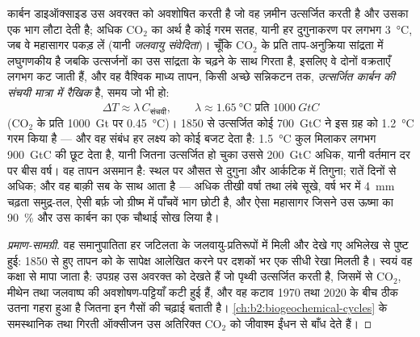 \begin{proposition}[तापन संचयी उत्सर्जनों के समानुपाती है]\label{prop:b2:global-change:tcre}
कार्बन डाइऑक्साइड उस अवरक्त को अवशोषित करती है जो वह ज़मीन उत्सर्जित करती है और उसका
एक भाग लौटा देती है; अधिक \ensuremath{\mathrm{CO_2}} का अर्थ है कोई गरम सतह, यानी
हर दुगुनाकरण पर लगभग \qty{3}{\celsius}, जब वे महासागर पकड़ लें
(यानी \emph{जलवायु संवेदिता})। चूँकि \ensuremath{\mathrm{CO_2}} के प्रति
ताप-अनुक्रिया सांद्रता में लघुगणकीय है जबकि उत्सर्जनों का  उस सांद्रता के चढ़ने के साथ गिरता है, इसलिए वे दोनों
वक्रताएँ लगभग कट जाती हैं, और वह वैश्विक माध्य तापन, किसी अच्छे
सन्निकटन तक, \emph{उत्सर्जित कार्बन की संचयी मात्रा में रैखिक} है,
समय जो भी हो:
\[
\Delta T \approx \lambda\,C_{\text{संचयी}}, \qquad \lambda \approx
\qty{1.65}{\celsius} \text{ प्रति } \qty{1000}{GtC}
\]
(\ensuremath{\mathrm{CO_2}} के प्रति \qty{1000}{Gt} पर \qty{0.45}{\celsius})। 1850 से
उत्सर्जित कोई \qty{700}{GtC} ने इस ग्रह को \qty{1.2}{\celsius}
गरम किया है --- और वह संबंध हर लक्ष्य को कोई
बजट देता है: \qty{1.5}{\celsius} कुल मिलाकर लगभग \qty{900}{GtC} की छूट देता है,
यानी जितना उत्सर्जित हो चुका उससे \qty{200}{GtC} अधिक, यानी वर्तमान
दर पर बीस वर्ष। वह तापन असमान है: स्थल पर औसत से दुगुना
और आर्कटिक में तिगुना; रातें दिनों से अधिक; और वह बाक़ी सब के साथ आता
है --- अधिक तीखी वर्षा तथा लंबे सूखे, वर्ष भर में \qty{4}{mm} चढ़ता
समुद्र-तल, ऐसी बर्फ़ जो ग्रीष्म में पाँचवें भाग छोटी है, और
ऐसा महासागर जिसने उस ऊष्मा का \qty{90}{\%} और उस कार्बन का
एक चौथाई सोख लिया है।
\end{proposition}
\begin{proof}[प्रमाण-सामग्री]
वह समानुपातिता हर जटिलता के जलवायु-प्रतिरूपों में मिली
और देखे गए अभिलेख से पुष्ट हुई: 1850 से हुए तापन को  के सापेक्ष आलेखित करने पर दशकों भर एक सीधी
रेखा मिलती है। स्वयं वह 
कक्षा से मापा जाता है: उपग्रह उस अवरक्त को देखते हैं जो पृथ्वी उत्सर्जित करती है, जिसमें से
\ensuremath{\mathrm{CO_2}}, मीथेन तथा जलवाष्प की अवशोषण-पट्टियाँ कटी हुई हैं,
और वह कटाव 1970 तथा 2020 के बीच ठीक उतना गहरा हुआ है
जितना इन गैसों की चढ़ाई बताती है। \cref{ch:b2:biogeochemical-cycles} के
समस्थानिक तथा गिरती ऑक्सीजन उस अतिरिक्त
\ensuremath{\mathrm{CO_2}} को जीवाश्म ईंधन से बाँध देते हैं।
\end{proof}

